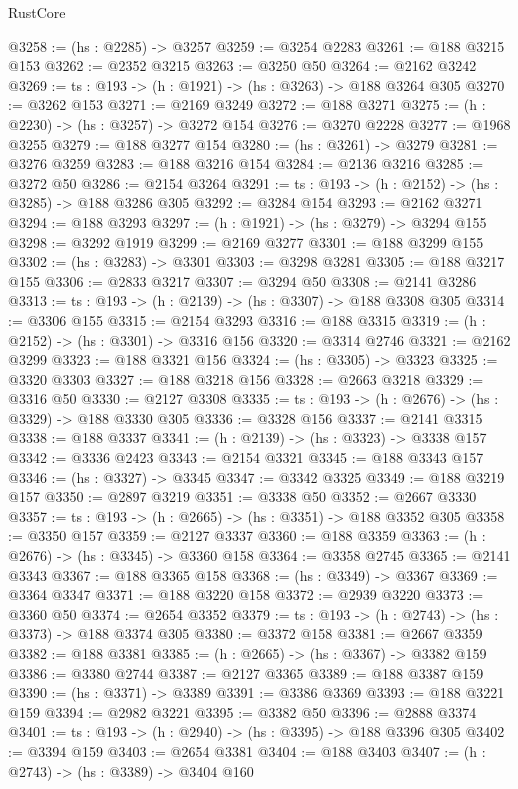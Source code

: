 \begin{lexlean}{RustCore}
\begin{coremodule}
@3258 := (hs : @2285) -> @3257
@3259 := @3254 @2283
@3261 := @188 @3215 @153
@3262 := @2352 @3215
@3263 := @3250 @50
@3264 := @2162 @3242
@3269 := {ts : @193} -> (h : @1921) -> (hs : @3263) -> @188 @3264 @305
@3270 := @3262 @153
@3271 := @2169 @3249
@3272 := @188 @3271
@3275 := (h : @2230) -> (hs : @3257) -> @3272 @154
@3276 := @3270 @2228
@3277 := @1968 @3255
@3279 := @188 @3277 @154
@3280 := (hs : @3261) -> @3279
@3281 := @3276 @3259
@3283 := @188 @3216 @154
@3284 := @2136 @3216
@3285 := @3272 @50
@3286 := @2154 @3264
@3291 := {ts : @193} -> (h : @2152) -> (hs : @3285) -> @188 @3286 @305
@3292 := @3284 @154
@3293 := @2162 @3271
@3294 := @188 @3293
@3297 := (h : @1921) -> (hs : @3279) -> @3294 @155
@3298 := @3292 @1919
@3299 := @2169 @3277
@3301 := @188 @3299 @155
@3302 := (hs : @3283) -> @3301
@3303 := @3298 @3281
@3305 := @188 @3217 @155
@3306 := @2833 @3217
@3307 := @3294 @50
@3308 := @2141 @3286
@3313 := {ts : @193} -> (h : @2139) -> (hs : @3307) -> @188 @3308 @305
@3314 := @3306 @155
@3315 := @2154 @3293
@3316 := @188 @3315
@3319 := (h : @2152) -> (hs : @3301) -> @3316 @156
@3320 := @3314 @2746
@3321 := @2162 @3299
@3323 := @188 @3321 @156
@3324 := (hs : @3305) -> @3323
@3325 := @3320 @3303
@3327 := @188 @3218 @156
@3328 := @2663 @3218
@3329 := @3316 @50
@3330 := @2127 @3308
@3335 := {ts : @193} -> (h : @2676) -> (hs : @3329) -> @188 @3330 @305
@3336 := @3328 @156
@3337 := @2141 @3315
@3338 := @188 @3337
@3341 := (h : @2139) -> (hs : @3323) -> @3338 @157
@3342 := @3336 @2423
@3343 := @2154 @3321
@3345 := @188 @3343 @157
@3346 := (hs : @3327) -> @3345
@3347 := @3342 @3325
@3349 := @188 @3219 @157
@3350 := @2897 @3219
@3351 := @3338 @50
@3352 := @2667 @3330
@3357 := {ts : @193} -> (h : @2665) -> (hs : @3351) -> @188 @3352 @305
@3358 := @3350 @157
@3359 := @2127 @3337
@3360 := @188 @3359
@3363 := (h : @2676) -> (hs : @3345) -> @3360 @158
@3364 := @3358 @2745
@3365 := @2141 @3343
@3367 := @188 @3365 @158
@3368 := (hs : @3349) -> @3367
@3369 := @3364 @3347
@3371 := @188 @3220 @158
@3372 := @2939 @3220
@3373 := @3360 @50
@3374 := @2654 @3352
@3379 := {ts : @193} -> (h : @2743) -> (hs : @3373) -> @188 @3374 @305
@3380 := @3372 @158
@3381 := @2667 @3359
@3382 := @188 @3381
@3385 := (h : @2665) -> (hs : @3367) -> @3382 @159
@3386 := @3380 @2744
@3387 := @2127 @3365
@3389 := @188 @3387 @159
@3390 := (hs : @3371) -> @3389
@3391 := @3386 @3369
@3393 := @188 @3221 @159
@3394 := @2982 @3221
@3395 := @3382 @50
@3396 := @2888 @3374
@3401 := {ts : @193} -> (h : @2940) -> (hs : @3395) -> @188 @3396 @305
@3402 := @3394 @159
@3403 := @2654 @3381
@3404 := @188 @3403
@3407 := (h : @2743) -> (hs : @3389) -> @3404 @160

\end{coremodule}
\end{lexlean}
